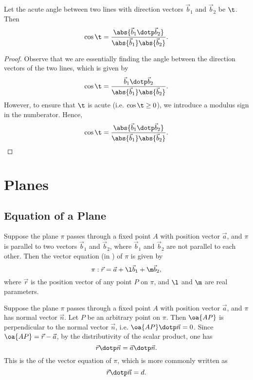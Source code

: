 \begin{proposition}
    Let the acute angle between two lines with direction vectors $\vec b_1$ and $\vec b_2$ be $\t$. Then \[\cos\t = \frac{\abs{\vec b_1 \dotp \vec b_2}}{\abs{\vec b_1} \abs{\vec b_2}}.\]
\end{proposition}
\begin{proof}
    Observe that we are essentially finding the angle between the direction vectors of the two lines, which is given by \[\cos\t = \frac{\vec b_1 \dotp \vec b_2}{\abs{\vec b_1} \abs{\vec b_2}}.\] However, to ensure that $\t$ is acute (i.e. $\cos \t \geq 0$), we introduce a modulus sign in the numberator. Hence, \[\cos\t = \frac{\abs{\vec b_1 \dotp \vec b_2}}{\abs{\vec b_1} \abs{\vec b_2}}.\]
\end{proof}

\section{Planes}


\subsection{Equation of a Plane}

\begin{definition}
    Suppose the plane $\pi$ passes through a fixed point $A$ with position vector $\vec a$, and $\pi$ is parallel to two vectors $\vec b_1$ and $\vec b_2$, where $\vec b_1$ and $\vec b_2$ are not parallel to each other. Then the vector equation (in ) of $\pi$ is given by \[\pi : \vec r = \vec a + \l \vec b_1 + \m \vec b_2,\] where $\vec r$ is the position vector of any point $P$ on $\pi$, and $\l$ and $\m$ are real parameters.
\end{definition}

\begin{definition}
    Suppose the plane $\pi$ passes through a fixed point $A$ with position vector $\vec a$, and $\pi$ has normal vector $\vec n$. Let $P$ be an arbitrary point on $\pi$. Then $\oa{AP}$ is perpendicular to the normal vector $\vec n$, i.e. $\oa{AP} \dotp \vec n = 0$. Since $\oa{AP} = \vec r - \vec a$, by the distributivity of the scalar product, one has \[\vec r \dotp \vec n = \vec a \dotp \vec n.\] This is the  of the vector equation of $\pi$, which is more commonly written as \[\vec r \dotp \vec n = d.\]
\end{definition}

